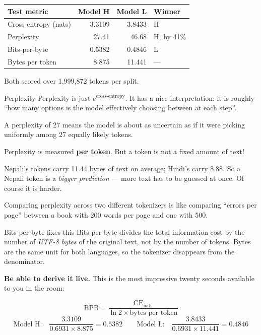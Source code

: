 \documentclass[11pt]{report}
\begin{document}
\begin{center}
\begin{tabular}{@{}lrrl@{}}
\toprule
\textbf{Test metric} & \textbf{Model H} & \textbf{Model L} & \textbf{Winner} \\
\midrule
Cross-entropy (nats) & 3.3109 & 3.8433 & H \\
Perplexity & 27.41 & 46.68 & H, by 41\% \\
Bits-per-byte & 0.5382 & 0.4846 & L \\
Bytes per token & 8.875 & 11.441 & --- \\
\bottomrule
\end{tabular}
\end{center}

Both scored over 1,999,872 tokens per split.

\begin{concept}{Perplexity}
Perplexity is just $e^{\text{cross-entropy}}$. It has a nice interpretation: it
is roughly ``how many options is the model effectively choosing between at each
step''.

A perplexity of 27 means the model is about as uncertain as if it were picking
uniformly among 27 equally likely tokens.
\end{concept}

\begin{warnbox}
Perplexity is measured \textbf{per token}. But a token is not a fixed amount of
text!

Nepali's tokens carry 11.44 bytes of text on average; Hindi's carry 8.88. So a
Nepali token is a \emph{bigger prediction} --- more text has to be guessed at
once. Of course it is harder.

Comparing perplexity across two different tokenizers is like comparing ``errors
per page'' between a book with 200 words per page and one with 500.
\end{warnbox}

\begin{concept}{Bits-per-byte fixes this}
Bits-per-byte divides the total information cost by the number of \emph{UTF-8
bytes} of the original text, not by the number of tokens. Bytes are the same
unit for both languages, so the tokenizer disappears from the denominator.
\end{concept}

\textbf{Be able to derive it live.} This is the most impressive twenty seconds
available to you in the room:

\[
\mathrm{BPB} = \frac{\mathrm{CE}_{\text{nats}}}{\ln 2 \times \text{bytes per token}}
\]
\[
\text{Model H:}\quad \frac{3.3109}{0.6931 \times 8.875} = 0.5382
\qquad
\text{Model L:}\quad \frac{3.8433}{0.6931 \times 11.441} = 0.4846
\]
\end{document}
